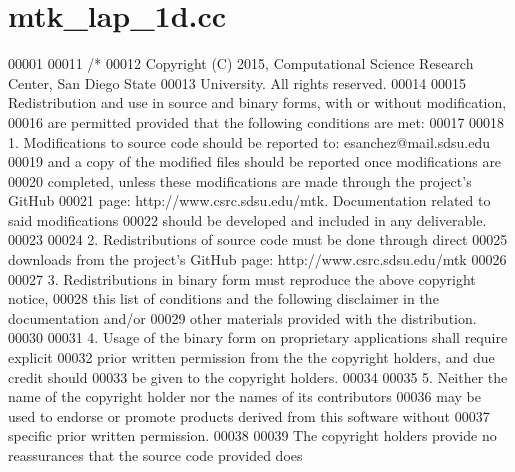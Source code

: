 \hypertarget{mtk__lap__1d_8cc_source}{\section{mtk\+\_\+lap\+\_\+1d.\+cc}
\label{mtk__lap__1d_8cc_source}
}

\begin{DoxyCode}
00001 
00011 \textcolor{comment}{/*}
00012 \textcolor{comment}{Copyright (C) 2015, Computational Science Research Center, San Diego State}
00013 \textcolor{comment}{University. All rights reserved.}
00014 \textcolor{comment}{}
00015 \textcolor{comment}{Redistribution and use in source and binary forms, with or without modification,}
00016 \textcolor{comment}{are permitted provided that the following conditions are met:}
00017 \textcolor{comment}{}
00018 \textcolor{comment}{1. Modifications to source code should be reported to: esanchez@mail.sdsu.edu}
00019 \textcolor{comment}{and a copy of the modified files should be reported once modifications are}
00020 \textcolor{comment}{completed, unless these modifications are made through the project's GitHub}
00021 \textcolor{comment}{page: http://www.csrc.sdsu.edu/mtk. Documentation related to said modifications}
00022 \textcolor{comment}{should be developed and included in any deliverable.}
00023 \textcolor{comment}{}
00024 \textcolor{comment}{2. Redistributions of source code must be done through direct}
00025 \textcolor{comment}{downloads from the project's GitHub page: http://www.csrc.sdsu.edu/mtk}
00026 \textcolor{comment}{}
00027 \textcolor{comment}{3. Redistributions in binary form must reproduce the above copyright notice,}
00028 \textcolor{comment}{this list of conditions and the following disclaimer in the documentation and/or}
00029 \textcolor{comment}{other materials provided with the distribution.}
00030 \textcolor{comment}{}
00031 \textcolor{comment}{4. Usage of the binary form on proprietary applications shall require explicit}
00032 \textcolor{comment}{prior written permission from the the copyright holders, and due credit should}
00033 \textcolor{comment}{be given to the copyright holders.}
00034 \textcolor{comment}{}
00035 \textcolor{comment}{5. Neither the name of the copyright holder nor the names of its contributors}
00036 \textcolor{comment}{may be used to endorse or promote products derived from this software without}
00037 \textcolor{comment}{specific prior written permission.}
00038 \textcolor{comment}{}
00039 \textcolor{comment}{The copyright holders provide no reassurances that the source code provided does}

\end{DoxyCode}
